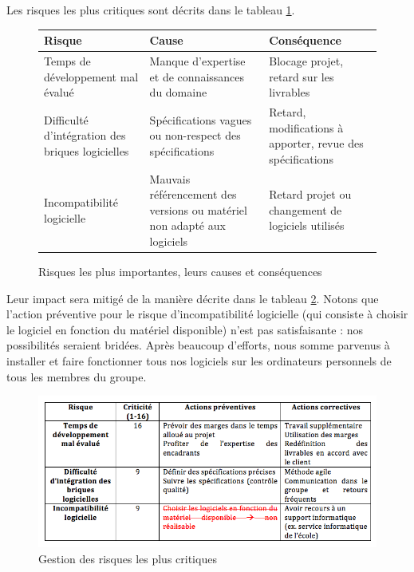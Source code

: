 \documentclass[a4paper,12pt]{report}
\begin{document}
Les risques les plus critiques sont décrits dans le tableau \ref{table:risques_importants}.

\begin{figure}[!htb]
\centering
\begin{tabular}{| p{4.5cm} | p{5cm} | p{5cm} |}
\hline
Risque & Cause & Conséquence \\
\hline
\hline
Temps de développement mal évalué & Manque d'expertise et de connaissances du domaine & Blocage projet, retard sur les livrables \\
\hline
Difficulté d'intégration des briques logicielles & Spécifications vagues ou non-respect des spécifications & Retard, modifications à apporter, revue des spécifications \\
\hline
Incompatibilité logicielle & Mauvais référencement des versions ou matériel non adapté aux logiciels & Retard projet ou changement de logiciels utilisés \\
\hline
\end{tabular}
\caption{Risques les plus importantes, leurs causes et conséquences}
\label{table:risques_importants}
\end{figure}


Leur impact sera mitigé de la manière décrite dans le tableau \ref{table:gestion_risques}. Notons que l'action préventive pour le risque d'incompatibilité logicielle (qui consiste à choisir le logiciel en fonction du matériel disponible) n'est pas satisfaisante : nos possibilités seraient bridées. Après beaucoup d'efforts, nous somme parvenus à installer et faire fonctionner tous nos logiciels sur les ordinateurs personnels de tous les membres du groupe.

\begin{figure}[!htb]
\centering
\includegraphics[width=14cm]{gestion_risques.png}
\caption{Gestion des risques les plus critiques}
\label{table:gestion_risques}
\end{figure}
\end{document}
